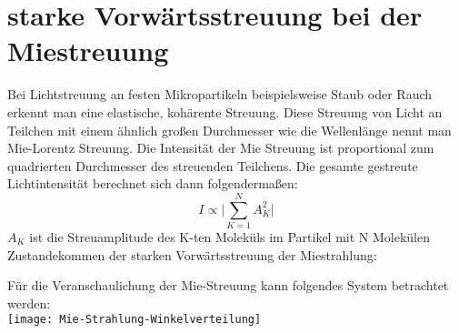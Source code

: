 \section{starke Vorwärtsstreuung bei der Miestreuung}
Bei Lichtstreuung an festen Mikropartikeln beispielsweise Staub oder Rauch erkennt man eine elastische, kohärente Streuung. Diese Streuung von Licht an Teilchen mit einem ähnlich großen Durchmesser wie die Wellenlänge nennt man Mie-Lorentz Streuung. Die Intensität der Mie Streuung ist proportional zum quadrierten Durchmesser des streuenden Teilchens. Die gesamte gestreute Lichtintensität berechnet sich dann folgendermaßen:
\begin{equation}
I\propto \biggl| \sum_{K=1}^N A^2_K \biggl|
\end{equation}
$A_K$ ist die Streuamplitude des K-ten Moleküls im Partikel mit N Molekülen
Zustandekommen der starken Vorwärtsstreuung der Miestrahlung: 

Für die Veranschaulichung der Mie-Streuung kann folgendes System betrachtet werden:\\




\texttt{[image: Mie-Strahlung-Winkelverteilung]}






